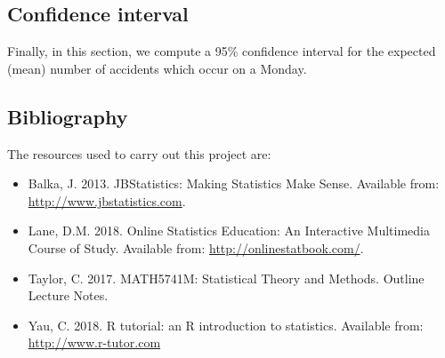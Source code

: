 \documentclass[]{article}
\newenvironment{Shaded}{\begin{snugshade}}{\end{snugshade}}
\newcommand{\KeywordTok}[1]{\textcolor[rgb]{0.13,0.29,0.53}{\textbf{{#1}}}}
\newcommand{\StringTok}[1]{\textcolor[rgb]{0.31,0.60,0.02}{{#1}}}
\newcommand{\CommentTok}[1]{\textcolor[rgb]{0.56,0.35,0.01}{\textit{{#1}}}}
\newcommand{\NormalTok}[1]{{#1}}
\providecommand{\tightlist}{%
  \setlength{\itemsep}{0pt}\setlength{\parskip}{0pt}}
\begin{document}
\subsection{Confidence interval}\label{confidence-interval}

Finally, in this section, we compute a 95\% confidence interval for the
expected (mean) number of accidents which occur on a Monday.

\begin{Shaded}
\end{Shaded}

\subsection{Bibliography}\label{bibliography}

The resources used to carry out this project are:

\begin{itemize}
\tightlist
\item
  Balka, J. 2013. JBStatistics: Making Statistics Make Sense. Available
  from: \url{http://www.jbstatistics.com}.
\item
  Lane, D.M. 2018. Online Statistics Education: An Interactive
  Multimedia Course of Study. Available from:
  \url{http://onlinestatbook.com/}.
\item
  Taylor, C. 2017. MATH5741M: Statistical Theory and Methods. Outline
  Lecture Notes.
\item
  Yau, C. 2018. R tutorial: an R introduction to statistics. Available
  from: \url{http://www.r-tutor.com}
\end{itemize}
\end{document}
